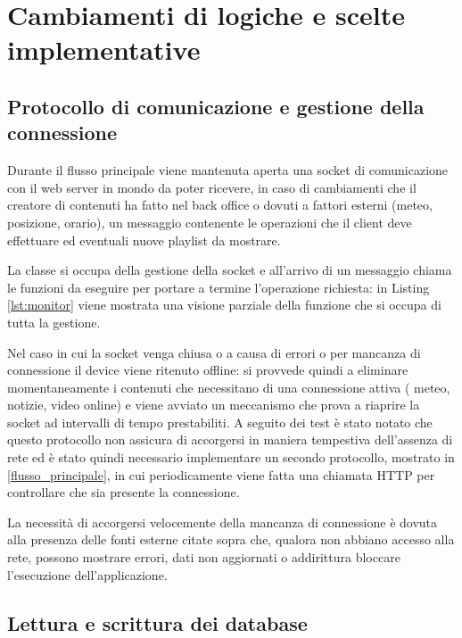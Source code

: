 \section{Cambiamenti di logiche e scelte implementative}

\subsection{Protocollo di comunicazione e gestione della connessione}\label{connection}

Durante il flusso principale viene mantenuta aperta una socket di comunicazione con il web server in mondo da poter ricevere, in caso di cambiamenti che il creatore di contenuti ha fatto nel back office o dovuti a fattori esterni (meteo, posizione, orario), un messaggio contenente le operazioni che il client deve effettuare ed eventuali nuove playlist da mostrare. 

La classe  si occupa della gestione della socket e all'arrivo di un messaggio chiama le funzioni da eseguire per portare a termine l'operazione richiesta: in Listing \ref*{lst:monitor} viene mostrata una visione parziale della funzione  che si occupa di tutta la gestione.



Nel caso in cui la socket venga chiusa o a causa di errori o per mancanza di connessione il device viene ritenuto offline: si provvede quindi a eliminare momentaneamente i contenuti che necessitano di una connessione attiva ( meteo, notizie, video online) e viene avviato un meccanismo che prova a riaprire la socket ad intervalli di tempo prestabiliti.
A seguito dei test è stato notato che questo protocollo non assicura di accorgersi in maniera tempestiva dell'assenza di rete ed è stato quindi necessario implementare un secondo protocollo, mostrato in \ref*{flusso_principale}, in cui periodicamente viene fatta una chiamata HTTP per controllare che sia presente la connessione.

La necessità di accorgersi velocemente della mancanza di connessione è dovuta alla presenza delle fonti esterne citate sopra che, qualora non abbiano accesso alla rete, possono mostrare errori, dati non aggiornati o addirittura bloccare l'esecuzione dell'applicazione.

\subsection{Lettura e scrittura dei database} \label{database}

